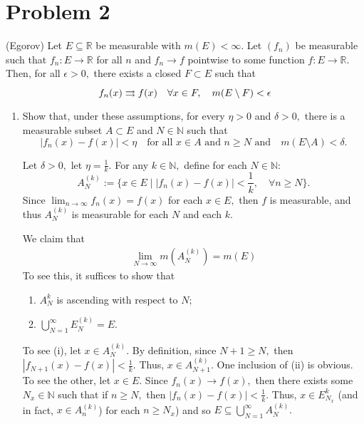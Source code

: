 \documentclass[11pt]{article}
\newcommand{\bbN}{\mathbb{N}}
\newcommand{\bbR}{\mathbb{R}}
\newcommand{\sm}{\setminus}
\begin{document}
\section*{Problem 2}
\begin{problem} (Egorov)
    Let $E\subseteq \bbR$ be measurable with $m(E) < \infty.$ Let $(f_n)$ be measurable such that $f_n : E\to \bbR$ for all $n$ and $f_n \to f$ pointwise to some function $f: E\to \bbR.$ Then, for all $\epsilon>0,$ there exists a closed $F\subset E$ such that 
    \[f_n(x)\uconv f(x) \quad \forall x\in F, \quad m(E\sm F) < \epsilon\]
\end{problem}
\begin{enumerate}
    \item 
    \begin{problem}
        Show that, under these assumptions, for every $\eta >0$ and $\delta>0,$ there is a measurable subset $A\subset E$ and $N \in \bbN$ such that 
        \[|f_n(x) - f(x)| < \eta \quad \text{for all $x\in A$ and $n \geq N$ and} \quad m(E\sm A) < \delta.\]
    \end{problem}
    \begin{solution}
        Let $\delta >0,$ let $\eta = \frac{1}{k}.$ For any $k \in \bbN,$ define for each $N \in \bbN:$
        \[A_N^{(k)} := \{x \in E \mid |f_n(x) - f(x)| < \frac{1}{k}, \quad \forall n \geq N\}.\] Since $\lim_{n\to \infty}f_n(x) = f(x)$ for each $x\in E,$ then $f$ is measurable, and thus $A_N^{(k)}$ is measurable for each $N$ and each $k.$ 

        We claim that 
        \begin{align}
        \lim_{N\to \infty}m(A_N^{(k)}) = m(E)    
        \end{align}
        To see this, it suffices to show that
        \begin{enumerate}
            \item $A_{N}^{k}$ is ascending with respect to $N;$
            \item $\bigcup_{N=1}^\infty E_N^{(k)} = E.$
        \end{enumerate}
        To see (i), let $x\in A_N^{(k)}.$ By definition, since $N+1 \geq N,$ then $|f_{N+1}(x) - f(x)| < \frac{1}{k}.$ Thus, $x\in A_{N+1}^{(k)}.$ One inclusion of (ii) is obvious. To see the other, let $x\in E.$ Since $f_n(x) \to f(x),$ then there exists some $N_x \in \bbN$ such that if $n\geq N,$ then $|f_n(x) - f(x)| < \frac{1}{k}.$ Thus, $x\in E^k_{N_x}$ (and in fact, $x\in A_n^{(k)}$) for each $n \geq N_x$) and so $E\subseteq \bigcup_{N=1}^\infty A_N^{(k)}.$  


\end{solution}
\end{enumerate}
\end{document}
